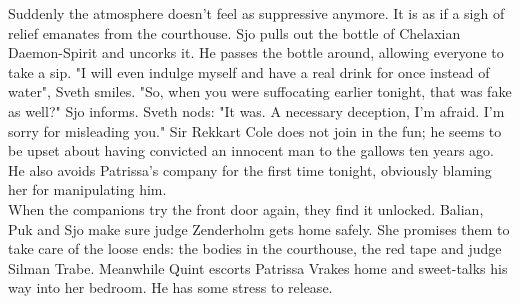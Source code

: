 Suddenly the atmosphere doesn't feel as suppressive anymore. It is as if a sigh of relief emanates from the courthouse. Sjo pulls out the bottle of Chelaxian Daemon-Spirit and uncorks it. He passes the bottle around, allowing everyone to take a sip. "I will even indulge myself and have a real drink for once instead of water", Sveth smiles. "So, when you were suffocating earlier tonight, that was fake as well?" Sjo informs. Sveth nods: "It was. A necessary deception, I'm afraid. I'm sorry for misleading you." Sir Rekkart Cole does not join in the fun; he seems to be upset about having convicted an innocent man to the gallows ten years ago. He also avoids Patrissa's company for the first time tonight, obviously blaming her for manipulating him.\\

When the companions try the front door again, they find it unlocked. Balian, Puk and Sjo make sure judge Zenderholm gets home safely. She promises them to take care of the loose ends: the bodies in the courthouse, the red tape and judge Silman Trabe. Meanwhile Quint escorts Patrissa Vrakes home and sweet-talks his way into her bedroom. He has some stress to release.\\

